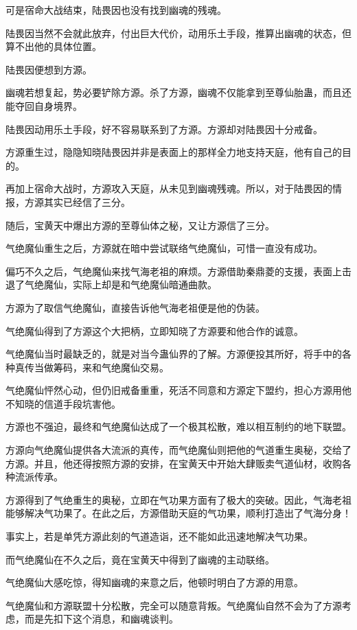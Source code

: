 \begin{this_body}
可是宿命大战结束，陆畏因也没有找到幽魂的残魂。

陆畏因当然不会就此放弃，付出巨大代价，动用乐土手段，推算出幽魂的状态，但算不出他的具体位置。

陆畏因便想到方源。

幽魂若想复起，势必要铲除方源。杀了方源，幽魂不仅能拿到至尊仙胎蛊，而且还能夺回自身境界。

陆畏因动用乐土手段，好不容易联系到了方源。方源却对陆畏因十分戒备。

方源重生过，隐隐知晓陆畏因并非是表面上的那样全力地支持天庭，他有自己的目的。

再加上宿命大战时，方源攻入天庭，从未见到幽魂残魂。所以，对于陆畏因的情报，方源其实已经信了三分。

随后，宝黄天中爆出方源的至尊仙体之秘，又让方源信了三分。

气绝魔仙重生之后，方源就在暗中尝试联络气绝魔仙，可惜一直没有成功。

偏巧不久之后，气绝魔仙来找气海老祖的麻烦。方源借助秦鼎菱的支援，表面上击退了气绝魔仙，实际上却是和气绝魔仙暗通曲款。

方源为了取信气绝魔仙，直接告诉他气海老祖便是他的伪装。

气绝魔仙得到了方源这个大把柄，立即知晓了方源要和他合作的诚意。

气绝魔仙当时最缺乏的，就是对当今蛊仙界的了解。方源便投其所好，将手中的各种真传当做筹码，来和气绝魔仙交易。

气绝魔仙怦然心动，但仍旧戒备重重，死活不同意和方源定下盟约，担心方源用他不知晓的信道手段坑害他。

方源也不强迫，最终和气绝魔仙达成了一个极其松散，难以相互制约的地下联盟。

方源向气绝魔仙提供各大流派的真传，而气绝魔仙则把他的气道重生奥秘，交给了方源。并且，他还得按照方源的安排，在宝黄天中开始大肆贩卖气道仙材，收购各种流派传承。

方源得到了气绝重生的奥秘，立即在气功果方面有了极大的突破。因此，气海老祖能够解决气功果了。在此之后，方源借助天庭的气功果，顺利打造出了气海分身！

事实上，若是单凭方源此刻的气道造诣，还不能如此迅速地解决气功果。

而气绝魔仙在不久之后，竟在宝黄天中得到了幽魂的主动联络。

气绝魔仙大感吃惊，得知幽魂的来意之后，他顿时明白了方源的用意。

气绝魔仙和方源联盟十分松散，完全可以随意背叛。气绝魔仙自然不会为了方源考虑，而是先扣下这个消息，和幽魂谈判。


\end{this_body}
